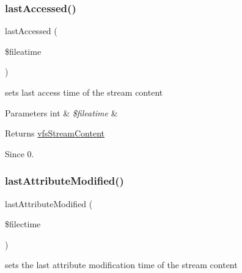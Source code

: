 \subsubsection{\texorpdfstring{last\+Accessed()}{lastAccessed()}}
{\footnotesize\ttfamily last\+Accessed (\begin{DoxyParamCaption}\item[{}]{\$fileatime }\end{DoxyParamCaption})}

sets last access time of the stream content


\begin{DoxyParams}[1]{Parameters}
int & {\em \$fileatime} & \\
\hline
\end{DoxyParams}
\begin{DoxyReturn}{Returns}
\mbox{\hyperlink{interfaceorg_1_1bovigo_1_1vfs_1_1vfs_stream_content}{vfs\+Stream\+Content}} 
\end{DoxyReturn}
\begin{DoxySince}{Since}
0. 
\end{DoxySince}
\mbox{\label{classorg_1_1bovigo_1_1vfs_1_1vfs_stream_abstract_content_af92f0658173972169c5900a0c0adc224}} 
\subsubsection{\texorpdfstring{last\+Attribute\+Modified()}{lastAttributeModified()}}
{\footnotesize\ttfamily last\+Attribute\+Modified (\begin{DoxyParamCaption}\item[{}]{\$filectime }\end{DoxyParamCaption})}

sets the last attribute modification time of the stream content


